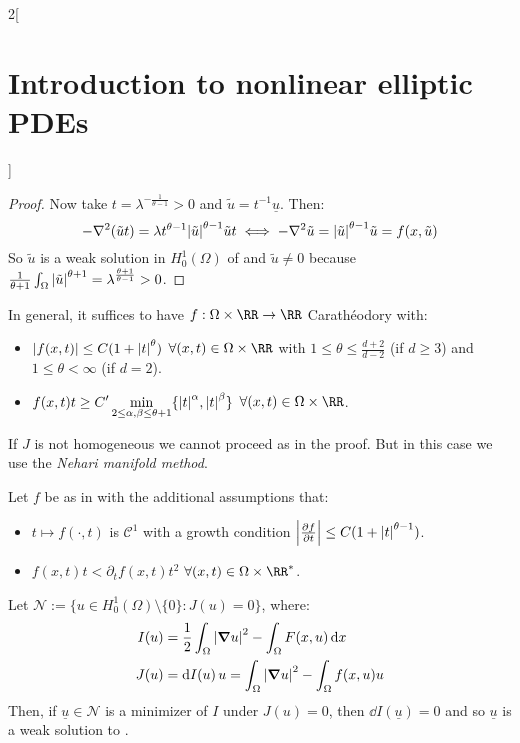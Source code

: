 \documentclass[../../../main_math.tex]{subfiles}
\begin{document}
\begin{multicols}{2}[\section{Introduction to nonlinear elliptic PDEs}]
\begin{proof}
    Now take $t=\lambda^{-\frac{1}{\theta-1}}>0$ and $\tilde{u}=t^{-1}\underline{u}$. Then:
    $$
      -\laplacian(\tilde{u}t)=\lambda t^{\theta-1}\abs{\tilde{u}}^{\theta-1}\tilde{u}t\iff -\laplacian \tilde{u}= \abs{\tilde{u}}^{\theta-1}\tilde{u}=f(x,\tilde{u})
    $$
    So $\tilde{u}$ is a weak solution in $H_0^1(\Omega)$ of  and $\tilde{u}\ne 0$ because $\frac{1}{\theta+1}\int_\Omega \abs{\tilde{u}}^{\theta+1}=\lambda^{\frac{\theta+1}{\theta-1}}>0$.
  \end{proof}
  \begin{remark}
    In general, it suffices to have $f:\Omega\times \RR\to\RR$ Carathéodory with:
    \begin{itemize}
      \item $\abs{f(x,t)}\leq C(1+\abs{t}^\theta)$ $\forall (x,t)\in \Omega\times \RR$ with $1\leq \theta\leq \frac{d+2}{d-2}$ (if $d\geq 3$) and $1\leq \theta<\infty$ (if $d=2$).
      \item $\displaystyle f(x,t)t\geq C'\min_{2\leq \alpha,\beta\leq \theta+1}\{\abs{t}^\alpha,\abs{t}^\beta\}$ $\forall (x,t)\in \Omega\times \RR$.
    \end{itemize}
  \end{remark}
  \begin{remark}
    If $J$ is not homogeneous we cannot proceed as in the proof. But in this case we use the \emph{Nehari manifold method}.
  \end{remark}
  \begin{proposition}
    Let $f$ be as in  with the additional assumptions that:
    \begin{itemize}
      \item $t\mapsto f(\cdot,t)$ is $\mathcal{C}^1$ with a growth condition $\abs{\pdv{f}{t}}\leq C(1+\abs{t}^{\theta-1})$.
      \item $f(x,t)t< \partial_tf(x,t)t^2$ $\forall (x,t)\in \Omega\times \RR^*$.
    \end{itemize}
    Let $\mathcal{N}:=\{u\in H_0^1(\Omega)\setminus\{0\}:J(u)=0\}$, where:
    \begin{align*}
      I(u) & =\frac{1}{2}\int_\Omega \abs{\grad u}^2-\int_\Omega F(x,u)\dd{x} \\
      J(u) & =\dd{I(u)}u = \int_\Omega \abs{\grad u}^2 -\int_\Omega f(x,u)u
    \end{align*}
    Then, if $\underline{u}\in\mathcal{N}$ is a minimizer of $I$ under $J(u)=0$, then $\dd{I(\underline{u})}=0$ and so $\underline{u}$ is a weak solution to .

\end{proposition}
\end{multicols}
\end{document}
